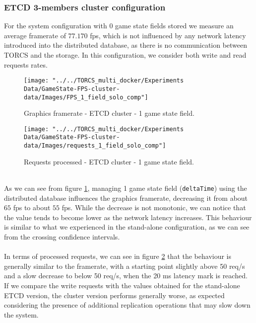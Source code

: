 \subsubsection{ETCD 3-members cluster configuration}
For the system configuration with 0 game state fields stored we measure an average framerate of $77.170$ fps, which is not influenced by any network latency introduced into the distributed database, as there is no communication between TORCS and the storage. In this configuration, we consider both write and read requests rates. \\
\begin{figure}[h!]
	\centering
	\texttt{[image: "../../TORCS\_multi\_docker/Experiments Data/GameState-FPS-cluster-data/Images/FPS\_1\_field\_solo\_comp"]}
	\caption[Graphics framerate - ETCD cluster - 1 game state field]{Graphics framerate - ETCD cluster - 1 game state field.}
	\label{fig:fps-1-field-etcd-cluster}
\end{figure}
\begin{figure}[h!]
	\centering
	\texttt{[image: "../../TORCS\_multi\_docker/Experiments Data/GameState-FPS-cluster-data/Images/requests\_1\_field\_solo\_comp"]}
	\caption[Requests processed - ETCD cluster - 1 game state field]{Requests processed - ETCD cluster - 1 game state field.}
	\label{fig:requests-1-field-etcd-cluster}
\end{figure}
\\ As we can see from figure \ref{fig:fps-1-field-etcd-cluster}, managing 1 game state field (\texttt{deltaTime}) using the distributed database influences the graphics framerate, decreasing it from about $65$ fps to about $55$ fps. While the decrease is not monotonic, we can notice that the value tends to become lower as the network latency increases. This behaviour is similar to what we experienced in the stand-alone configuration, as we can see from the crossing confidence intervals. \\ \\
In terms of processed requests, we can see in figure \ref{fig:requests-1-field-etcd-cluster} that the behaviour is generally similar to the framerate, with a starting point slightly above 50 req/s and a slow decrease to below 50 req/s, when the 20 ms latency mark is reached. If we compare the write requests with the values obtained for the stand-alone ETCD version, the cluster version performs generally worse, as expected considering the presence of additional replication operations that may slow down the system. \\
